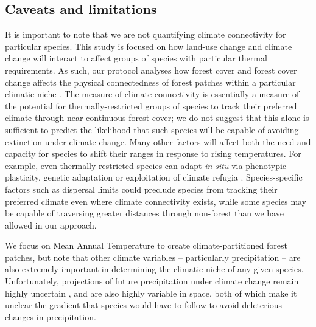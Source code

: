 \documentclass[12pt,a4paper,]{report}
\theoremstyle{definition}
\theoremstyle{definition}
\theoremstyle{definition}
\theoremstyle{remark}
\begin{document}
\subsection{Caveats and limitations}\label{caveats-and-limitations}

It is important to note that we are not quantifying climate connectivity
for particular species. This study is focused on how land-use change and
climate change will interact to affect groups of species with particular
thermal requirements. As such, our protocol analyses how forest cover
and forest cover change affects the physical connectedness of forest
patches within a particular climatic niche
\citep[cf.][]{mcguire_achieving_2016}. The measure of climate
connectivity is essentially a measure of the potential for
thermally-restricted groups of species to track their preferred climate
through near-continuous forest cover; we do not suggest that this alone
is sufficient to predict the likelihood that such species will be
capable of avoiding extinction under climate change. Many other factors
will affect both the need and capacity for species to shift their ranges
in response to rising temperatures. For example, even
thermally-restricted species can adapt \emph{in situ} via phenotypic
plasticity, genetic adaptation or exploitation of climate refugia
\citep{parmesan_ecological_2006, hannah_fine-grain_2014}.
Species-specific factors such as dispersal limits could preclude species
from tracking their preferred climate even where climate connectivity
exists, while some species may be capable of traversing greater
distances through non-forest than we have allowed in our approach.

We focus on Mean Annual Temperature to create climate-partitioned forest
patches, but note that other climate variables -- particularly
precipitation -- are also extremely important in determining the
climatic niche of any given species. Unfortunately, projections of
future precipitation under climate change remain highly uncertain
\citep{ipcc_climate_2013, corlett_climate_2012}, and are also highly
variable in space, both of which make it unclear the gradient that
species would have to follow to avoid deleterious changes in
precipitation.
\end{document}
